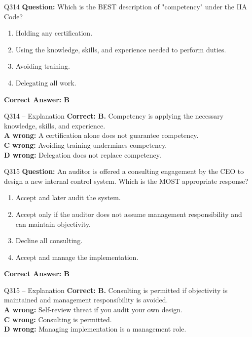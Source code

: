 \documentclass[aspectratio=169,10pt]{beamer}
\begin{document}
	\begin{frame}[t]{Q314}
		\small
		\textbf{Question:} Which is the BEST description of "competency" under the IIA Code?
		\begin{enumerate}[label=\Alph*.,itemsep=1pt,topsep=2pt]
			\item Holding any certification.
			\item Using the knowledge, skills, and experience needed to perform duties.
			\item Avoiding training.
			\item Delegating all work.
		\end{enumerate}
		\vspace{4pt}
		\textbf{Correct Answer: B}
	\end{frame}
	
	\begin{frame}[t]{Q314 -- Explanation}
		\small
		\textbf{Correct: B.} Competency is applying the necessary knowledge, skills, and experience. \\[4pt]
		\textbf{A wrong:} A certification alone does not guarantee competency. \\[2pt]
		\textbf{C wrong:} Avoiding training undermines competency. \\[2pt]
		\textbf{D wrong:} Delegation does not replace competency.
	\end{frame}
	
	\begin{frame}[t]{Q315}
		\small
		\textbf{Question:} An auditor is offered a consulting engagement by the CEO to design a new internal control system. Which is the MOST appropriate response?
		\begin{enumerate}[label=\Alph*.,itemsep=1pt,topsep=2pt]
			\item Accept and later audit the system.
			\item Accept only if the auditor does not assume management responsibility and can maintain objectivity.
			\item Decline all consulting.
			\item Accept and manage the implementation.
		\end{enumerate}
		\vspace{4pt}
		\textbf{Correct Answer: B}
	\end{frame}
	
	\begin{frame}[t]{Q315 -- Explanation}
		\small
		\textbf{Correct: B.} Consulting is permitted if objectivity is maintained and management responsibility is avoided. \\[4pt]
		\textbf{A wrong:} Self-review threat if you audit your own design. \\[2pt]
		\textbf{C wrong:} Consulting is permitted. \\[2pt]
		\textbf{D wrong:} Managing implementation is a management role.
	\end{frame}
	
\end{document}
